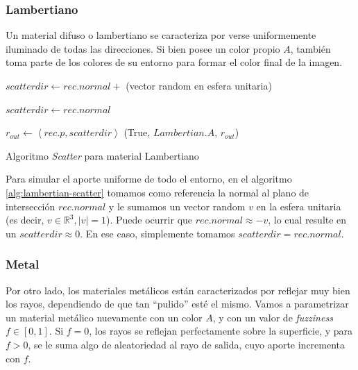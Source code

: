 \subsubsection{Lambertiano}

Un material difuso o lambertiano se caracteriza por verse uniformemente
iluminado de todas las direcciones. Si bien posee un color propio $A$, también
toma parte de los colores de su entorno para formar el color final de la imagen.

\begin{algorithm}[H]
\begin{algorithmic}[1]

    \State $scatterdir \gets rec.normal +$ (vector random en esfera unitaria)

        \State $scatterdir \gets rec.normal$
    \EndIf

    \State $r_{out} \gets \left \langle rec.p, scatterdir \right \rangle$
    \State \Return (True, $Lambertian.A$, $r_{out}$)
\EndFunction
\end{algorithmic}
\caption{Algoritmo \textit{Scatter} para material Lambertiano}
\label{alg:lambertian-scatter}
\end{algorithm}

Para simular el aporte uniforme de todo el entorno, en el algoritmo
\ref{alg:lambertian-scatter} tomamos como referencia la normal al plano de
intersección $rec.normal$ y le sumamos un vector random $v$ en la esfera
unitaria (es decir, $v \in \mathbb{R}^3, \vert v \vert = 1$). Puede ocurrir que
$rec.normal \approx -v$, lo cual resulte en un $scatterdir \approx 0$. En ese
caso, simplemente tomamos $scatterdir = rec.normal$.

\subsubsection{Metal}

Por otro lado, los materiales metálicos están caracterizados por reflejar muy
bien los rayos, dependiendo de que tan ``pulido'' esté el mismo. Vamos a
parametrizar un material metálico nuevamente con un color $A$, y con un valor de
\textit{fuzziness} $f \in [0, 1]$. Si $f=0$, los rayos se reflejan perfectamente
sobre la superficie, y para $f>0$, se le suma algo de aleatoriedad al rayo de
salida, cuyo aporte incrementa con $f$.

